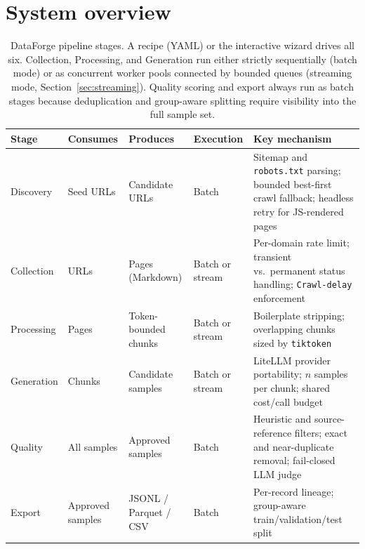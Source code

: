 \documentclass[11pt]{article}
\begin{document}
\section{System overview}
\label{sec:overview}

\begin{table}[h]
  \centering
  \small
  \caption{DataForge pipeline stages. A recipe (YAML) or the
  interactive wizard drives all six. Collection, Processing, and
  Generation run either strictly sequentially (batch mode) or as
  concurrent worker pools connected by bounded queues (streaming mode,
  Section~\ref{sec:streaming}). Quality scoring and export always run
  as batch stages because deduplication and group-aware splitting
  require visibility into the full sample set.}
  \label{tab:architecture}
  \begin{tabular}{@{}l p{2.1cm} p{2.1cm} l p{5.2cm}@{}}
    \toprule
    Stage & Consumes & Produces & Execution & Key mechanism \\
    \midrule
    Discovery  & Seed URLs & Candidate URLs & Batch &
      Sitemap and \texttt{robots.txt} parsing; bounded best-first crawl fallback;
      headless retry for JS-rendered pages \\
    Collection & URLs & Pages (Markdown) & Batch or stream &
      Per-domain rate limit; transient vs.\ permanent status handling;
      \texttt{Crawl-delay} enforcement \\
    Processing & Pages & Token-bounded chunks & Batch or stream &
      Boilerplate stripping; overlapping chunks sized by
      \texttt{tiktoken} \\
    Generation & Chunks & Candidate samples & Batch or stream &
      LiteLLM provider portability; $n$ samples per chunk; shared
      cost/call budget \\
    Quality    & All samples & Approved samples & Batch &
      Heuristic and source-reference filters; exact and near-duplicate
      removal; fail-closed LLM judge \\
    Export     & Approved samples & JSONL / Parquet / CSV & Batch &
      Per-record lineage; group-aware train/validation/test split \\
    \bottomrule
  \end{tabular}
\end{table}
\end{document}
